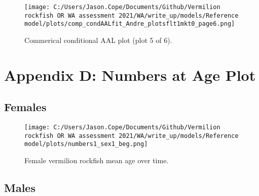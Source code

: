 \documentclass[11pt,
  english,
  a4paper,
]{article}
\begin{document}
\tagmcend\tagstructend


\begin{figure}
\centering
\texttt{[image: C:/Users/Jason.Cope/Documents/Github/Vermilion rockfish OR WA assessment 2021/WA/write\_up/models/Reference model/plots/comp\_condAALfit\_Andre\_plotsflt1mkt0\_page6.png]}
\caption{Commerical conditional AAL plot (plot 5 of 6).\label{fig:comp_condAALfit_Andre_plotsflt1mkt0_page6}}
\end{figure}

\tagmcend\tagstructend

\clearpage


\hypertarget{app-d}{%
\section{Appendix D: Numbers at Age Plot}\label{app-d}}

\leavevmode\tagmcend\tagstructend


\hypertarget{females}{%
\subsection{Females}\label{females}}

\leavevmode\tagmcend\tagstructend


\begin{figure}
\centering
\texttt{[image: C:/Users/Jason.Cope/Documents/Github/Vermilion rockfish OR WA assessment 2021/WA/write\_up/models/Reference model/plots/numbers1\_sex1\_beg.png]}
\caption{Female vermilion rockfish mean age over time.\label{fig:num_age_females}}
\end{figure}

\tagmcend\tagstructend


\hypertarget{males}{%
\subsection{Males}\label{males}}
\end{document}
